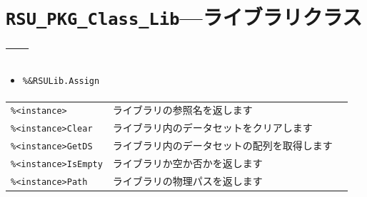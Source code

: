\section{\texttt{RSU\_PKG\_Class\_Lib}\;---\;ライブラリクラス\;---}\label{sec:RSU_PKG_Class_Lib}
\paragraph{\DocStrTitleClassCreationFunction}
\begin{itemize}
\item\texttt{\%\&RSULib.Assign}
\end{itemize}
\paragraph{\DocStrTitleClassFunctionList}
\begin{center}
{\footnotesize
\begin{xltabular}{\textwidth}{|p{3.5truecm}|X|p{1.5truecm}|}
\hline
\thead{\DocStrHeaderFunctionName}&\thead{\DocStrDescription}&\thead{\DocStrRefto}\\
\hline
\hline
\texttt{\%<instance>}&ライブラリの参照名を返します&\\
\hline
\texttt{\%<instance>Clear}&ライブラリ内のデータセットをクリアします&\\
\hline
\texttt{\%<instance>GetDS}&ライブラリ内のデータセットの配列を取得します&\\
\hline
\texttt{\%<instance>IsEmpty}&ライブラリか空か否かを返します&\\
\hline
\texttt{\%<instance>Path}&ライブラリの物理パスを返します&\\
\hline
\end{xltabular}
}
\end{center}

